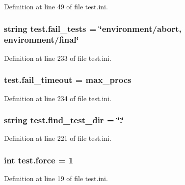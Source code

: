 Definition at line 49 of file test.\-ini.

\hypertarget{namespacetest_ae0ea3fdd2b6f2c8c3bb11f0afc20a097}{
\subsubsection[{fail\-\_\-tests}]{\setlength{\rightskip}{0pt plus 5cm}string test.\-fail\-\_\-tests = \char`\"{}environment/abort, environment/final\char`\"{}}}\label{namespacetest_ae0ea3fdd2b6f2c8c3bb11f0afc20a097}


Definition at line 233 of file test.\-ini.

\hypertarget{namespacetest_abfd7a3bf875f29c0fe5342e1345eef93}{
\subsubsection[{fail\-\_\-timeout}]{\setlength{\rightskip}{0pt plus 5cm}test.\-fail\-\_\-timeout = max\-\_\-procs}}\label{namespacetest_abfd7a3bf875f29c0fe5342e1345eef93}


Definition at line 234 of file test.\-ini.

\hypertarget{namespacetest_a8ff2dd5a1198312fe9ada87a755956ab}{
\subsubsection[{find\-\_\-test\-\_\-dir}]{\setlength{\rightskip}{0pt plus 5cm}string test.\-find\-\_\-test\-\_\-dir = \char`\"{}.\char`\"{}}}\label{namespacetest_a8ff2dd5a1198312fe9ada87a755956ab}


Definition at line 221 of file test.\-ini.

\hypertarget{namespacetest_ad4773f49ae244cf1cfa3fe9cbbce0d67}{
\subsubsection[{force}]{\setlength{\rightskip}{0pt plus 5cm}int test.\-force = 1}}\label{namespacetest_ad4773f49ae244cf1cfa3fe9cbbce0d67}


Definition at line 19 of file test.\-ini.

